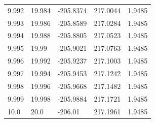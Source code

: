 \begin{tabular}{lllll}
9.992 & 19.984 & -205.8374 & 217.0044 & 1.9485 \\
9.993 & 19.986 & -205.8589 & 217.0284 & 1.9485 \\
9.994 & 19.988 & -205.8805 & 217.0523 & 1.9485 \\
9.995 & 19.99 & -205.9021 & 217.0763 & 1.9485 \\
9.996 & 19.992 & -205.9237 & 217.1003 & 1.9485 \\
9.997 & 19.994 & -205.9453 & 217.1242 & 1.9485 \\
9.998 & 19.996 & -205.9668 & 217.1482 & 1.9485 \\
9.999 & 19.998 & -205.9884 & 217.1721 & 1.9485 \\
10.0 & 20.0 & -206.01 & 217.1961 & 1.9485 \\
\bottomrule
\end{tabular}
